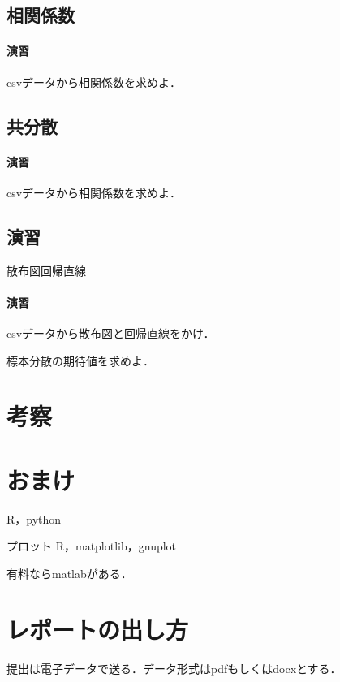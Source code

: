 \documentclass[12pt, a4j]{jreport}
\begin{document}
\subsection{相関係数}

\paragraph{演習}
csvデータから相関係数を求めよ．

\subsection{共分散}

\paragraph{演習}
csvデータから相関係数を求めよ．

\subsection{演習}
散布図回帰直線

\paragraph{演習}

csvデータから散布図と回帰直線をかけ．


標本分散の期待値を求めよ．

\section{考察}



\section{おまけ}
R，python

プロット
R，matplotlib，gnuplot


有料ならmatlabがある．

\section{レポートの出し方}

提出は電子データで送る．データ形式はpdfもしくはdocxとする．
\end{document}
